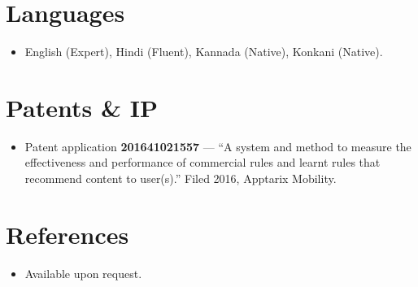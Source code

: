 \documentclass[11pt,a4paper,sans]{moderncv}
\begin{document}

\section{Languages}
\vspace{1pt}
\begin{itemize}
\item {English (Expert), Hindi (Fluent), Kannada (Native), Konkani (Native).}
\end{itemize}


\section{Patents \& IP}
\vspace{1pt}
\begin{itemize}
\item {Patent application \textbf{201641021557} — ``A system and method to measure the effectiveness and performance of commercial rules and learnt rules that recommend content to user(s).'' Filed 2016, Apptarix Mobility.}
\end{itemize}


\section{References}
\vspace{1pt}
\begin{itemize}
\item{Available upon request.}
\end{itemize}
\end{document}
